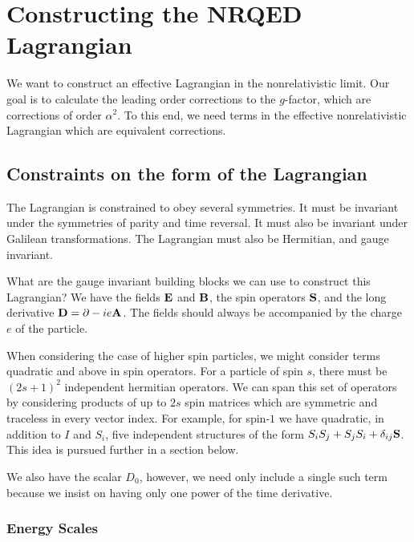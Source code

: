 \section{Constructing the NRQED Lagrangian}





We want to construct an effective Lagrangian in the nonrelativistic limit.  Our goal is to calculate the leading order corrections to the $g$-factor, which are corrections of order $\alpha^2$.  To this end, we need terms in the effective nonrelativistic Lagrangian which are equivalent corrections.


\subsection{Constraints on the form of the Lagrangian}
The Lagrangian is constrained to obey several symmetries.  It must be invariant under the symmetries of parity and time reversal.  It must also be invariant under Galilean transformations.  The Lagrangian must also be Hermitian, and gauge invariant.

What are the gauge invariant building blocks we can use to construct this Lagrangian?  We have the fields $\mathbf{E}$ and $\mathbf{B}$, the spin operators $\mathbf{S}$, and the long derivative $\mathbf{D} = \mathbf{\partial} - i e\mathbf{A}$.  The fields should always be accompanied by the charge $e$ of the particle.

When considering the case of higher spin particles, we might consider terms quadratic and above in spin operators.  For a particle of spin $s$, there must be $(2s+1)^2$ independent hermitian operators.  We can span this set of operators by considering products of up to $2s$ spin matrices which are symmetric and traceless in every vector index.  For example, for spin-$1$ we have quadratic, in addition to $I$ and $S_i$, five independent structures of the form $ S_i S_j + S_j S_i + \delta_{ij} \mathbf{S}$.  This idea is pursued further in a section below.


We also have the scalar $D_0$, however, we need only include a single such term because we insist on having only one power of the time derivative.



\subsubsection{Energy Scales}

